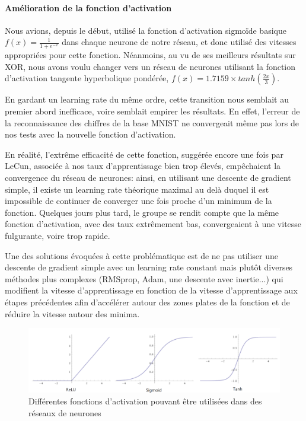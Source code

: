 \documentclass[
    10pt,
    a4paper,
    oneside,
    headinclude,footinclude,
    BCOR=5mm,
    captions=tableabove
]{scrartcl}
\begin{document}
\paragraph{Amélioration de la fonction d'activation}
Nous avions, depuis le début, utilisé la fonction d'activation sigmoïde basique $f(x) = \frac{1}{1 + e^{-x}}$ dans chaque neurone de notre réseau, et donc utilisé des vitesses appropriées pour cette fonction.
Néanmoins, au vu de ses meilleurs résultats sur XOR, nous avons voulu changer vers un réseau de neurones utilisant  la fonction d'activation tangente hyperbolique pondérée, $f(x) = 1.7159 \times tanh(\frac{2x}{3})$.

En gardant un learning rate du même ordre, cette transition nous semblait au premier abord inefficace, voire semblait empirer les résultats. En effet, l'erreur de la reconnaissance des chiffres de la base MNIST ne convergeait même pas lors de nos tests avec la nouvelle fonction d'activation. 

En réalité, l'extrême efficacité de cette fonction, suggérée encore une fois par LeCun, associée à nos taux d'apprentissage bien trop élevés, empêchaient la convergence du réseau de neurones: ainsi, en utilisant une descente de gradient simple, il existe un learning rate théorique maximal au delà duquel il est impossible de continuer de converger une fois proche d'un minimum de la fonction. 
Quelques jours plus tard, le groupe se rendit compte que la même fonction d'activation, avec des taux extrêmement bas, convergeaient à une vitesse fulgurante, voire trop rapide. %

Une des solutions évoquées à cette problématique est de ne pas utiliser une descente de gradient simple avec un learning rate constant mais plutôt diverses méthodes plus complexes (RMSprop, Adam, une descente avec inertie...) qui modifient la vitesse d'apprentissage en fonction de la vitesse d'apprentissage aux étapes précédentes afin d'accélérer autour des zones plates de la fonction et de réduire la vitesse autour des minima.

\begin{figure}[h!]
\includegraphics[width=\linewidth]{activations.PNG}
\centering
\caption{Différentes fonctions d'activation pouvant être utilisées dans des réseaux de neurones }
\label{fig:activations.PNG}
\end{figure}
\end{document}
